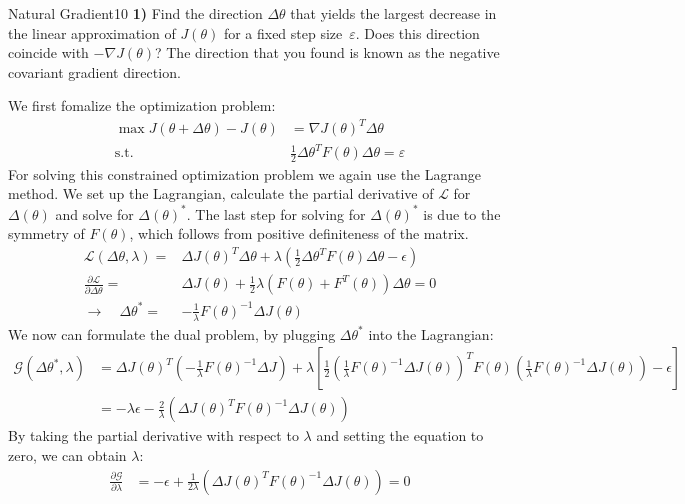 \begin{questions}
\begin{question}[bonus]{Natural Gradient}{10}
\textbf{1)} Find the direction $\Delta \theta$ that yields
the largest decrease in the linear approximation of $J(\theta)$
for a fixed step size~$\varepsilon$.
Does this direction coincide with $-\nabla J(\theta)$?
The direction that you found is known as the
negative covariant gradient direction.
\begin{answer}
We first fomalize the optimization problem:
\begin{equation*}
\begin{aligned} \max J({\theta}+{\Delta} {\theta}) - J({\theta})& = {\nabla} J({\theta})^{T} {\Delta} {\theta} \\ \text {s.t.}&\frac{1}{2} {\Delta} {\theta}^{T} F(\theta) {\Delta} {\theta}=\varepsilon \end{aligned}
\end{equation*}
For solving this constrained optimization problem we again use the Lagrange method. We set up the Lagrangian, calculate the partial derivative of $\mathcal{L}$ for $\Delta(\theta)$ and solve for $\Delta(\theta)^*$. The last step for solving for  $\Delta(\theta)^*$ is due to the symmetry of $F(\theta)$, which follows from positive definiteness of the matrix.
\begin{align*}
\mathcal{L}(\Delta\theta,\lambda) =
&\Delta J(\theta)^T \Delta \theta + \lambda (\frac{1}{2}\Delta\theta^TF(\theta)\Delta\theta-\epsilon) \\
\frac{\partial\mathcal{L}}{\partial\Delta\theta} =& \Delta J(\theta)+ \frac{1}{2}\lambda (F(\theta)+F^T(\theta))\Delta\theta = 0 \\
\rightarrow \quad \Delta \theta^* =&- \frac{1}{\lambda}F(\theta)^{-1}\Delta J(\theta)
\end{align*}
We now can formulate the dual problem, by plugging $\Delta \theta^*$ into the Lagrangian:
\begin{align*}
\mathcal{G}(\Delta\theta^*,\lambda) &= \Delta J(\theta)^T(-\frac{1}{\lambda}F(\theta)^{-1}\Delta J)+\lambda\left[\frac{1}{2} (\frac{1}{\lambda}F(\theta)^{-1}\Delta J (\theta))^TF(\theta)(\frac{1}{\lambda}F(\theta)^{-1}\Delta J(\theta))-\epsilon\right] \\
&= -\lambda\epsilon - \frac{2}{\lambda}(\Delta J(\theta)^T F(\theta)^{-1}\Delta J(\theta))
\end{align*}
By taking the partial derivative with respect to $\lambda$ and setting the equation to zero, we can obtain $\lambda$:
\begin{align*}
\frac{\partial\mathcal{G}}{\partial\lambda}&=-\epsilon+\frac{1}{2\lambda}(\Delta J(\theta)^T F(\theta)^{-1}\Delta J(\theta))= 0  \\

\end{align*}
\end{answer}
\end{question}
\end{questions}

